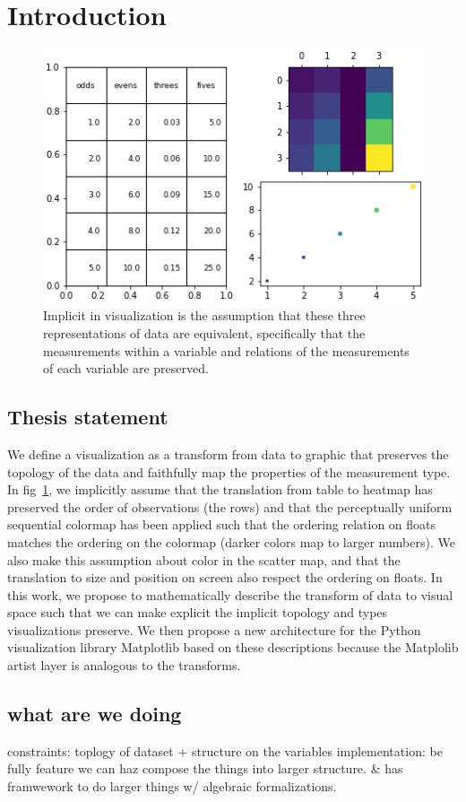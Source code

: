 \documentclass[../main.tex]{subfiles}
\begin{document}
\section{Introduction}
\label{sec:introduction}
\begin{figure}
    \includegraphics[width=.5\textwidth]{figures/intro/viz_same.png}
    \caption[]{Implicit in visualization is the assumption that these three representations of data are equivalent, specifically that the measurements within a variable and relations of the measurements of each variable are preserved. }
    \label{fig:viz_same}
    
\end{figure}

\subsection{Thesis statement}
We define a visualization as a transform from data to graphic that preserves the topology of the data and faithfully map the properties of the measurement type. In fig~\ref{fig:viz_same}, we implicitly assume that the translation from table to heatmap has preserved the order of observations (the rows) and that the perceptually uniform sequential colormap has been applied such that the ordering relation on floats matches the ordering on the colormap (darker colors map to larger numbers). We also make this assumption about color in the scatter map, and that the translation to size and position on screen also respect the ordering on floats. In this work, we propose to mathematically describe the transform of data to visual space such that we can make explicit the implicit topology and types visualizations preserve. We then propose a new architecture for the Python visualization library Matplotlib \cite{hunterMatplotlib2DGraphics2007} based on these descriptions because the Matplolib artist layer is analogous to the transforms. 


\subsection{what are we doing}
constraints: toplogy of dataset + structure on the variables
implementation: be fully feature
we can haz compose the things into larger structure. \& has framwework to do larger things w/ algebraic formalizations.
\end{document}
